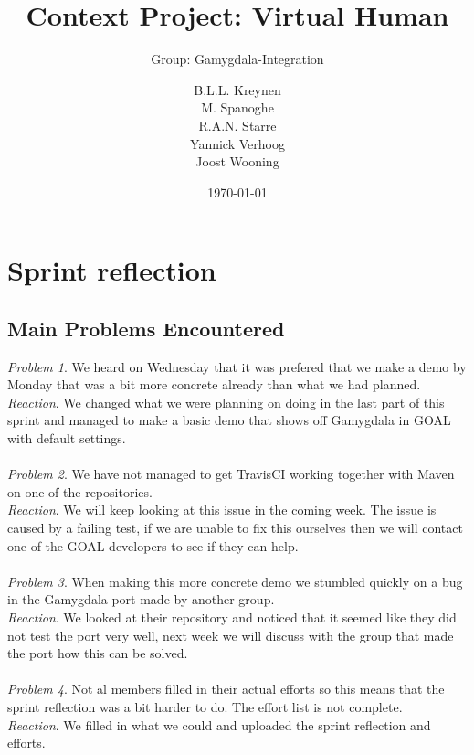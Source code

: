 \documentclass{scrartcl}
\begin{document}
\title{Context Project: Virtual Human}
\subtitle{Group: Gamygdala-Integration}
\date{\today{}}

\author{
    \begin{tabular}{l r}
      B.L.L. Kreynen\\
      M. Spanoghe\\
      R.A.N. Starre\\
      Yannick Verhoog\\
      Joost Wooning\\
    \end{tabular}
}

\maketitle \thispagestyle{empty} \pagebreak

\section{Sprint reflection}

\subsection{Main Problems Encountered}

\emph{Problem 1}. We heard on Wednesday that it was prefered that we make a demo by Monday that was a bit more concrete already than what we had planned.\\
\emph{Reaction}. We changed what we were planning on doing in the last part of this sprint and managed to make a basic demo that shows off Gamygdala in GOAL with default settings.\\
\\
\emph{Problem 2}. We have not managed to get TravisCI working together with Maven on one of the repositories.\\
\emph{Reaction}. We will keep looking at this issue in the coming week. The issue is caused by a failing test, if we are unable to fix this ourselves then we will contact one of the GOAL developers to see if they can help.\\
\\
\emph{Problem 3}. When making this more concrete demo we stumbled quickly on a bug in the Gamygdala port made by another group.\\
\emph{Reaction}. We looked at their repository and noticed that it seemed like they did not test the port very well, next week we will discuss with the group that made the port how this can be solved.\\
\\
\emph{Problem 4}. Not al members filled in their actual efforts so this means that the sprint reflection was a bit harder to do. The effort list is not complete. \\
\emph{Reaction}. We filled in what we could and uploaded the sprint reflection and efforts.\\
\\
\end{document}
